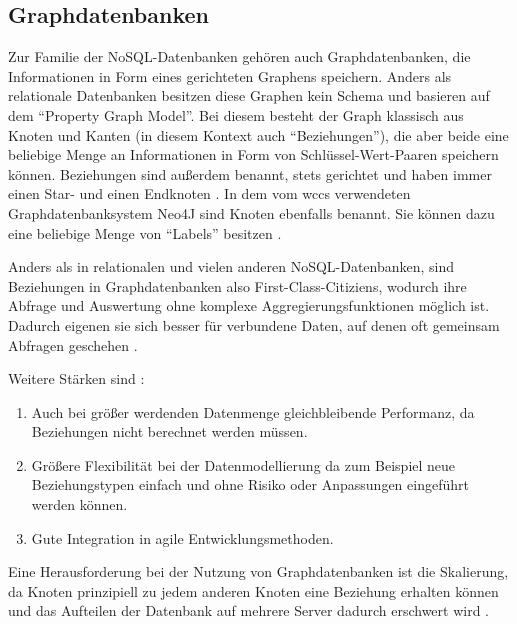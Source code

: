 \subsection{Graphdatenbanken}
    Zur Familie der NoSQL-Datenbanken gehören auch Graphdatenbanken,
    die Informationen in Form eines gerichteten Graphens speichern.
    Anders als relationale Datenbanken besitzen diese Graphen kein Schema
    und basieren auf dem "`Property Graph Model"'.
    Bei diesem besteht der Graph klassisch aus Knoten und Kanten
    (in diesem Kontext auch "`Beziehungen"'),
    die aber beide eine beliebige Menge an Informationen in Form
    von Schlüssel-Wert-Paaren speichern können.
    Beziehungen sind außerdem benannt, stets gerichtet und haben immer einen
    Star- und einen Endknoten
    \cite[Kapitel 1]{robinson:graphdatabases}.
    In dem vom \gls{wccs} verwendeten Graphdatenbanksystem Neo4J sind Knoten ebenfalls benannt.
    Sie können dazu eine beliebige Menge von "`Labels"' besitzen
    \cite[Kapitel 1.2.1.4]{neo4j:documentation}.

    Anders als in relationalen und vielen anderen NoSQL-Datenbanken,
    sind Beziehungen in Graphdatenbanken also First-Class-Citiziens,
    wodurch ihre Abfrage und Auswertung ohne komplexe Aggregierungsfunktionen möglich ist.
    Dadurch eigenen sie sich besser für verbundene Daten,
    auf denen oft gemeinsam Abfragen geschehen
    \cite[Kapitel 2]{robinson:graphdatabases}
    \cite[Kapitel 11.2]{sadalage:nosql}.

    Weitere Stärken sind
    \cite[Kapitel 1]{robinson:graphdatabases}
    \cite[Kapitel 11.1]{sadalage:nosql}:
    
    \begin{enumerate}
        \item   Auch bei größer werdenden Datenmenge gleichbleibende Performanz,
                da Beziehungen nicht berechnet werden müssen.
        \item   Größere Flexibilität bei der Datenmodellierung da zum Beispiel
                neue Beziehungstypen einfach und ohne Risiko oder Anpassungen eingeführt werden können.
        \item   Gute Integration in agile Entwicklungsmethoden.
    \end{enumerate}
    
    Eine Herausforderung bei der Nutzung von Graphdatenbanken ist die Skalierung,
    da Knoten prinzipiell zu jedem anderen Knoten eine Beziehung erhalten können
    und das Aufteilen der Datenbank auf mehrere Server dadurch erschwert wird
    \cite[Kapitel 11.2.5]{sadalage:nosql}.

